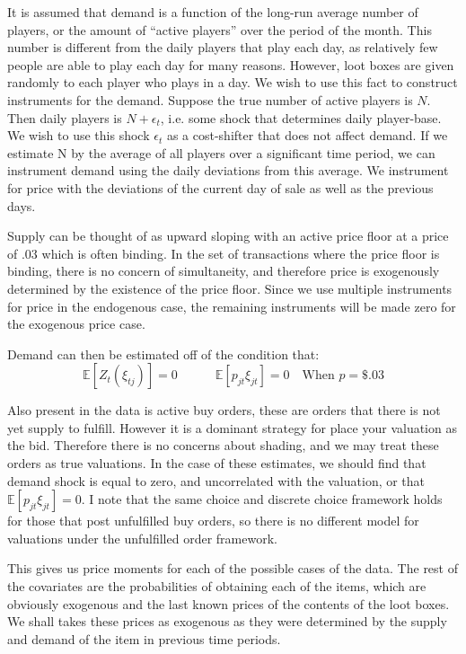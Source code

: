 \documentclass[12pt]{paper}
\newcommand{\exV}[1]{\mathbb{E} \left [ #1 \right ]}
\begin{document}
It is assumed that demand is a function of the long-run average number
of players, or the amount of ``active players'' over the period of the
month. This number is different from the daily players that play each
day, as relatively few people are able to play each day for many
reasons. However, loot boxes are given randomly to each player who
plays in a day. We wish to use this fact to construct instruments for
the demand. Suppose the true number of active players is $N$. Then daily
players is $N + \epsilon_t$, i.e. some shock that determines daily
player-base. We wish to use this shock $\epsilon_t$ as a cost-shifter that
does not affect demand. If we estimate N by the average of all players
over a significant time period, we can instrument demand using the
daily deviations from this average. We instrument for price with the
deviations of the current day of sale as well as the previous days.


Supply can be thought of as upward sloping with an active price floor
at a price of $.03$ which is often binding. In the set of transactions
where the price floor is binding, there is no concern of simultaneity,
and therefore price is exogenously determined by the existence of the
price floor. Since we use multiple instruments for price in the
endogenous case, the remaining instruments will be made zero for the
exogenous price case. 

Demand can then be estimated off of the condition that:
\begin{equation*}
  \exV{Z_t (\xi_{tj})} = 0 \quad \quad \quad \exV{ p_{jt} \xi_{jt} } = 0 \quad \text{When } p = \$.03
\end{equation*}


Also present in the data is active buy orders, these are orders
that there is not yet supply to fulfill. However it is a dominant
strategy for place your valuation as the bid. Therefore there is no
concerns about shading, and we may treat these orders as true
valuations. In the case of these estimates, we should find that demand
shock is equal to zero, and uncorrelated with the valuation, or that
$\exV{p_{jt}\xi_{jt}} = 0$. I note that the same choice and discrete
choice framework holds for those that post unfulfilled buy orders, so
there is no different model for valuations under the unfulfilled order
framework. 

This gives us price moments for each of the possible cases of the
data. The rest of the covariates are the probabilities of obtaining
each of the items, which are obviously exogenous and the last known
prices of the contents of the loot boxes. We shall takes these prices
as exogenous as they were determined by the supply and demand of the
item in previous time periods.
\end{document}
